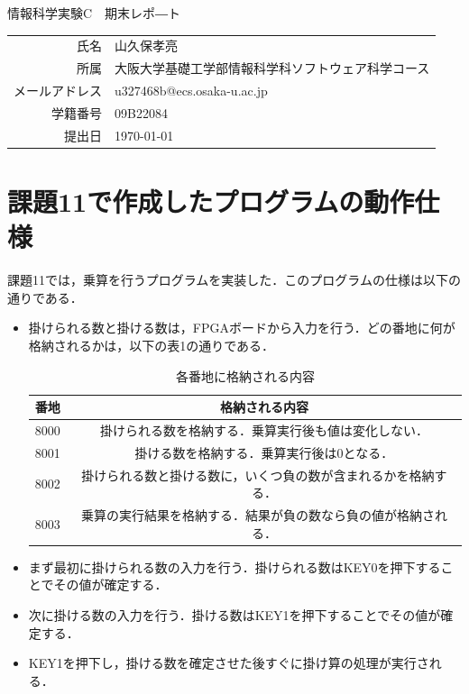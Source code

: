 \documentclass[dvipdfmx]{jarticle}
\begin{document}
\begin{titlepage}
    \begin{center}
        {\huge 情報科学実験C　期末レポ―ト}
        \vspace{180pt}\\
        \begin{tabular}{rl}
            氏名 & 山久保孝亮\\
            所属 & 大阪大学基礎工学部情報科学科ソフトウェア科学コース\\
            メールアドレス & u327468b@ecs.osaka-u.ac.jp\\
            学籍番号 & 09B22084\\
            提出日 & \today\\
        \end{tabular}
    \end{center}
\end{titlepage}
\section{課題11で作成したプログラムの動作仕様}
課題11では，乗算を行うプログラムを実装した．このプログラムの仕様は以下の通りである．
\begin{itemize}
  \item 掛けられる数と掛ける数は，FPGAボードから入力を行う．どの番地に何が格納されるかは，以下の表1の通りである．
  \begin{table}[h]
    \centering
    \begin{tabular}{|c|c|}
      \hline
      番地 & 格納される内容\\\hline
      8000 & 掛けられる数を格納する．乗算実行後も値は変化しない．\\\hline
      8001 & 掛ける数を格納する．乗算実行後は0となる．\\\hline
      8002 & 掛けられる数と掛ける数に，いくつ負の数が含まれるかを格納する．\\\hline
      8003 & 乗算の実行結果を格納する．結果が負の数なら負の値が格納される．\\\hline
    \end{tabular}
    \caption{各番地に格納される内容}
  \end{table}
  \item まず最初に掛けられる数の入力を行う．掛けられる数はKEY0を押下することでその値が確定する．
  \item 次に掛ける数の入力を行う．掛ける数はKEY1を押下することでその値が確定する．
  \item KEY1を押下し，掛ける数を確定させた後すぐに掛け算の処理が実行される．
\end{itemize}
\end{document}
